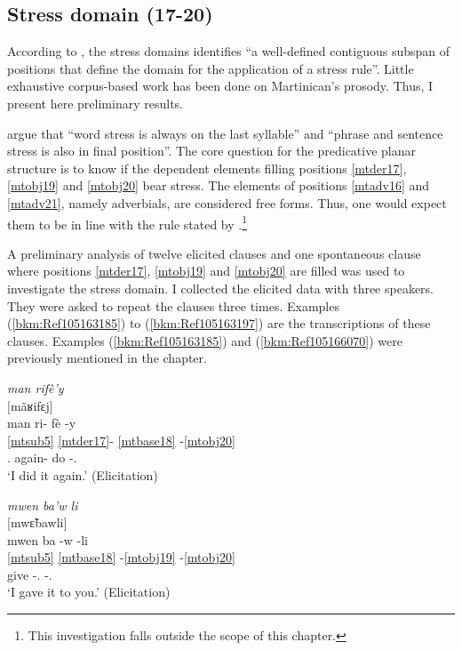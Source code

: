 \documentclass[output=paper]{langscibook}
\begin{document}
\subsection{Stress domain (17-20)}
\largerpage[2]
According to \citet[16]{tallman2021constituency}, the stress domains identifies ``a well-defined contiguous subspan of positions that define the domain for the application of a stress rule''. Little exhaustive corpus-based work has been done on Martinican’s prosody. Thus, I present here preliminary results.

\citet{Colot2013} argue that ``word stress is always on the last syllable'' and ``phrase and sentence stress is also in final position''. The core question for the predicative planar structure is to know if the dependent elements filling positions \ref{mtder17}, \ref{mtobj19} and \ref{mtobj20} bear stress. The elements of positions \ref{mtadv16} and \ref{mtadv21}, namely adverbials, are considered free forms. Thus, one would expect them to be in line with the rule stated by \citet{Colot2013}.\footnote{This investigation falls outside the scope of this chapter.}

A preliminary analysis of twelve elicited clauses and one spontaneous clause where positions \ref{mtder17}, \ref{mtobj19} and \ref{mtobj20} are filled was used to investigate the stress domain. I collected the elicited data with three speakers. They were asked to repeat the clauses three times. Examples (\ref{bkm:Ref105163185}) to (\ref{bkm:Ref105163197}) are the transcriptions of these clauses. Examples (\ref{bkm:Ref105163185}) and (\ref{bkm:Ref105166070}) were previously mentioned in the chapter.

\ea\label{bkm:Ref105163185}
\textit{man rifè’y}\\
$[$mãʁifɛj$]$\\
\glll man ri- fè -y\\
\ref{mtsub5} \ref{mtder17}- \ref{mtbase18} -\ref{mtobj20} \\
\First\Sg.\Sarg{} again- do -\Third\Sg.\Obj{}\\
\glt `I did it again.' (Elicitation)
\z
 
\ea\label{bkm:Ref105166070}
\textit{mwen ba’w li}\\
$[$mwɛ̃bawli$]$\\
\glll mwen ba -w -li\\
\ref{mtsub5} \ref{mtbase18} -\ref{mtobj19} -\ref{mtobj20} \\ 
\First\Sg{} give -\Second\Sg.\Obj{} -\Third\Sg.\Obj{}\\
\glt `I gave it to you.' (Elicitation)
\z
\end{document}
